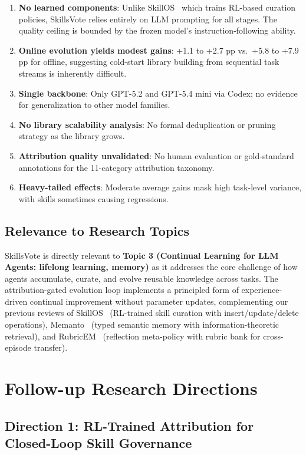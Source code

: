 \documentclass[11pt,a4paper]{article}
\begin{document}
\begin{enumerate}[nosep]
\item \textbf{No learned components}: Unlike SkillOS~\cite{skillos} which trains RL-based curation policies, SkillsVote relies entirely on LLM prompting for all stages. The quality ceiling is bounded by the frozen model's instruction-following ability.
\item \textbf{Online evolution yields modest gains}: +1.1 to +2.7 pp vs.\ +5.8 to +7.9 pp for offline, suggesting cold-start library building from sequential task streams is inherently difficult.
\item \textbf{Single backbone}: Only GPT-5.2 and GPT-5.4 mini via Codex; no evidence for generalization to other model families.
\item \textbf{No library scalability analysis}: No formal deduplication or pruning strategy as the library grows.
\item \textbf{Attribution quality unvalidated}: No human evaluation or gold-standard annotations for the 11-category attribution taxonomy.
\item \textbf{Heavy-tailed effects}: Moderate average gains mask high task-level variance, with skills sometimes causing regressions.
\end{enumerate}

\subsection{Relevance to Research Topics}

SkillsVote is directly relevant to \textbf{Topic 3 (Continual Learning for LLM Agents: lifelong learning, memory)} as it addresses the core challenge of how agents accumulate, curate, and evolve reusable knowledge across tasks. The attribution-gated evolution loop implements a principled form of experience-driven continual improvement without parameter updates, complementing our previous reviews of SkillOS~\cite{skillos} (RL-trained skill curation with insert/update/delete operations), Memanto~\cite{memanto} (typed semantic memory with information-theoretic retrieval), and RubricEM~\cite{rubricem} (reflection meta-policy with rubric bank for cross-episode transfer).

\section{Follow-up Research Directions}

\subsection{Direction 1: RL-Trained Attribution for Closed-Loop Skill Governance}
\end{document}

